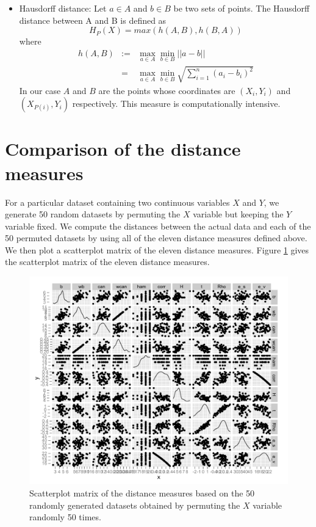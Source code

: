 \documentclass[12]{report}
\begin{document}
\begin{itemize}
\item Hausdorff distance: Let $a \in A$ and $b \in B$ be two sets of points. The Hausdorff distance between A and B is defined as
 \[
H_P(X)  = max (h(A, B), h(B, A))
\]
where 
\begin{eqnarray*}
h(A, B) &:=& \max_{a \in A} \min_{b \in B} ||a - b|| \\ & = & \max_{a \in A} \min_{b \in B} \sqrt{\sum_{i=1}^n (a_i - b_i)^2}
\end{eqnarray*}
In our case $A$ and $B$ are the points whose coordinates are $(X_i, Y_i)$ and $(X_{P(i)}, Y_i)$ respectively. This measure is computationally intensive.

\end{itemize}


\section{Comparison of the distance measures}

For a particular dataset containing two continuous variables $X$ and $Y$, we generate 50 random datasets by permuting the $X$ variable but keeping the $Y$ variable fixed. We compute the distances between the actual data and each of the 50 permuted datasets by using all of the eleven distance measures defined above. We then plot a scatterplot matrix of the eleven distance measures. Figure \ref{scamat} gives the scatterplot matrix of the eleven distance measures.

\begin{figure}[htbp]
   \centering
       \includegraphics[width=5in]{sca_plot_matrix.pdf}
	\vspace{-.2in}
       \caption{Scatterplot matrix of the distance measures based on the 50 randomly generated datasets obtained by permuting the $X$ variable randomly 50 times.}
       \label{scamat}
\end{figure}
\end{document}
